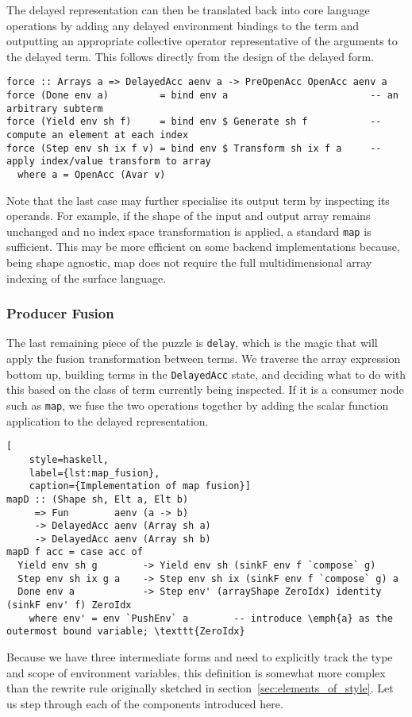 The delayed representation can then be translated back into core language
operations by adding any delayed environment bindings to the term and outputting
an appropriate collective operator representative of the arguments to the
delayed term. This follows directly from the design of the delayed form.
%
\begin{lstlisting}[style=haskell]
force :: Arrays a => DelayedAcc aenv a -> PreOpenAcc OpenAcc aenv a
force (Done env a)         = bind env a                         -- an arbitrary subterm
force (Yield env sh f)     = bind env $ Generate sh f           -- compute an element at each index
force (Step env sh ix f v) = bind env $ Transform sh ix f a     -- apply index/value transform to array
  where a = OpenAcc (Avar v)
\end{lstlisting}
%
Note that the last case may further specialise its output term by inspecting its
operands. For example, if the shape of the input and output array remains
unchanged and no index space transformation is applied, a standard \texttt{map}
is sufficient. This may be more efficient on some backend implementations
because, being shape agnostic, map does not require the full multidimensional
array indexing of the surface language.

\subsubsection{Producer Fusion}

The last remaining piece of the puzzle is \texttt{delay}, which is the magic
that will apply the fusion transformation between terms. We traverse the array
expression bottom up, building terms in the \texttt{DelayedAcc} state, and
deciding what to do with this based on the class of term currently being
inspected. If it is a consumer node such as \texttt{map}, we fuse the two
operations together by adding the scalar function application to the delayed
representation.
%
\begin{lstlisting}[
    style=haskell,
    label={lst:map_fusion},
    caption={Implementation of map fusion}]
mapD :: (Shape sh, Elt a, Elt b)
     => Fun        aenv (a -> b)
     -> DelayedAcc aenv (Array sh a)
     -> DelayedAcc aenv (Array sh b)
mapD f acc = case acc of
  Yield env sh g        -> Yield env sh (sinkF env f `compose` g)
  Step env sh ix g a    -> Step env sh ix (sinkF env f `compose` g) a
  Done env a            -> Step env' (arrayShape ZeroIdx) identity (sinkF env' f) ZeroIdx
    where env' = env `PushEnv` a        -- introduce \emph{a} as the outermost bound variable; \texttt{ZeroIdx}
\end{lstlisting}
%
Because we have three intermediate forms and need to explicitly track the type
and scope of environment variables, this definition is somewhat more complex
than the rewrite rule originally sketched in
section~\ref{sec:elements_of_style}. Let us step through each of the components
introduced here.


